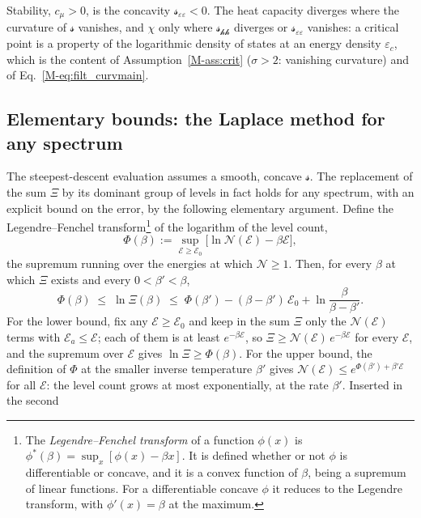 \documentclass[10pt,a4paper]{article}
\theoremstyle{plain}
\theoremstyle{remark}
\newcommand{\cN}{\mathcal{N}}   %
\newcommand{\hfield}{\mathscr{h}}  %
\newcommand{\enrg}{\mathcal{E}}  %
\newcommand{\lds}{\mathscr{s}}  %
\begin{document}
Stability, $ c_\mu > 0 $, is the concavity $ \lds_{\varepsilon\varepsilon} < 0 $.
The heat capacity diverges where the curvature of $\lds$ vanishes, and $\chi$
only where $ \lds_{\hfield\hfield} $ diverges or $ \lds_{\varepsilon\varepsilon} $ vanishes: a
critical point is a property of the logarithmic density of states at an
energy density $ \varepsilon_c $, which is the content of
Assumption~\ref{M-ass:crit} ($\sigma>2$: vanishing curvature) and of
Eq.~\eqref{M-eq:filt_curvmain}.

\subsection{Elementary bounds: the Laplace method for any spectrum}
\label{sec:second_bounds}

The steepest-descent evaluation assumes a smooth, concave $\lds$. The
replacement of the sum $\Xi$ by its dominant group of levels in fact holds
for any spectrum, with an explicit bound on the error, by the following
elementary argument. Define the Legendre--Fenchel transform\footnote{The
\emph{Legendre--Fenchel transform} of a function $\phi(x)$ is
$\phi^{*}(\beta)=\sup_x[\phi(x)-\beta x]$. It is defined whether or not
$\phi$ is differentiable or concave, and it is a convex function of
$\beta$, being a supremum of linear functions. For a differentiable concave
$\phi$ it reduces to the Legendre transform, with $\phi'(x)=\beta$ at the
maximum.} of the logarithm of the level count,
\begin{equation}\label{eq:filt_Phi}
  \Phi(\beta):=\sup_{\enrg\ge\enrg_0}\big[\ln\cN(\enrg)-\beta\enrg\big] ,
\end{equation}
the supremum running over the energies at which $\cN\ge1$. Then, for every
$\beta$ at which $\Xi$ exists and every $0<\beta'<\beta$,
\begin{equation}\label{eq:filt_bounds}
  \Phi(\beta)\;\le\;\ln\Xi(\beta)\;\le\;\Phi(\beta')-(\beta-\beta')\,\enrg_0+\ln\frac{\beta}{\beta-\beta'} .
\end{equation}
For the lower bound, fix any $\enrg\ge\enrg_0$ and keep in the sum $\Xi$ only
the $\cN(\enrg)$ terms with $\enrg_a\le\enrg$; each of them is at least
$e^{-\beta\enrg}$, so $\Xi\ge\cN(\enrg)\,e^{-\beta\enrg}$ for every $\enrg$, and the
supremum over $\enrg$ gives $\ln\Xi\ge\Phi(\beta)$. For the upper bound, the
definition of $\Phi$ at the smaller inverse temperature $\beta'$ gives
$\cN(\enrg)\le e^{\Phi(\beta')+\beta'\enrg}$ for all $\enrg$: the level count
grows at most exponentially, at the rate $\beta'$. Inserted in the second
\end{document}
